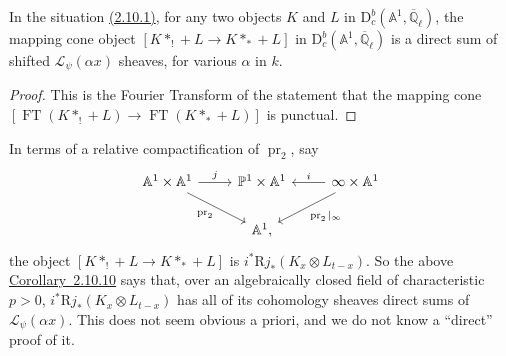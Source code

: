 In the situation \hyperref[par:2.10.1]{(2.10.1)}, for any two objects \(K\) and
\(L\) in \(\mathrm{D}^b_c(\mathbb{A}^1,\overline{\mathbb{Q}}_\ell)\), the
mapping cone object \([K*_!+L\to K*_*+L]\) in
\(\mathrm{D}^b_c(\mathbb{A}^1,\overline{\mathbb{Q}}_\ell)\) is a direct sum of
shifted \(\mathcal{L}_\psi(\alpha x)\) sheaves, for various \(\alpha\) in \(k\).

\begin{proof}
This is the Fourier Transform of the statement that the mapping cone
\([\operatorname{FT}(K*_!+L)\to\operatorname{FT}(K*_*+L)]\) is punctual.
\end{proof}

In terms of a relative compactification of \(\operatorname{pr}_2\), say
\[
  \begin{tikzcd}
  \mathbb{A}^1\times\mathbb{A}^1
    \arrow[r,"j"] \arrow[dr,"\operatorname{pr}_2"']
    & \mathbb{P}^1\times\mathbb{A}^1
    & \infty\times\mathbb{A}^1 \arrow[l,"i"'] \arrow[dl,"\operatorname{pr}_2|_\infty"]\\
  & \mathbb{A}^1,
  \end{tikzcd}
\]
the object \([K*_!+L\to K*_*+L]\) is
\(i^*\mathrm{R}j_*(K_x\otimes L_{t-x})\). So the above
\hyperref[cor:2.10.10]{Corollary~2.10.10} says that, over an algebraically
closed field of characteristic \(p>0\),
\(i^*\mathrm{R}j_*(K_x\otimes L_{t-x})\) has all of its cohomology sheaves
direct sums of \(\mathcal{L}_\psi(\alpha x)\). This does not seem obvious a
priori, and we do not know a ``direct'' proof of it.

